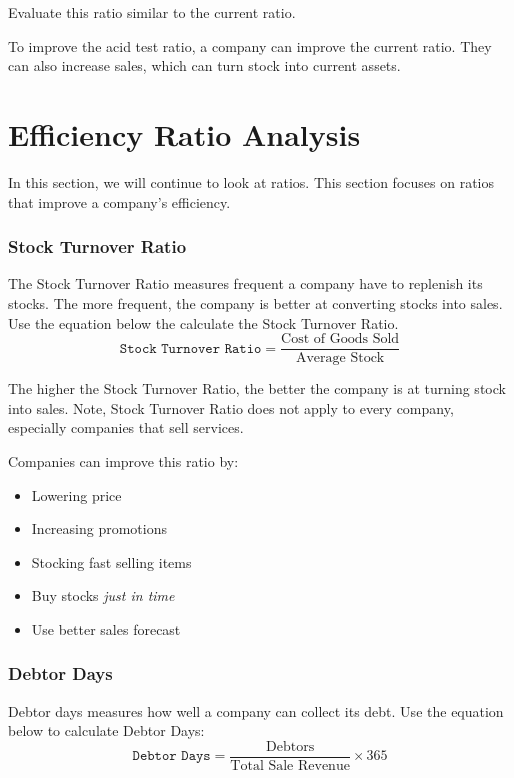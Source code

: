 \documentclass{standalone}
\begin{document}
Evaluate this ratio similar to the current ratio.

To improve the acid test ratio, a company can improve the current ratio.
They can also increase sales, which can turn stock into current assets.

\section{Efficiency Ratio Analysis}
In this section, we will continue to look at ratios.
This section focuses on ratios that improve a company's efficiency.

\subsubsection{Stock Turnover Ratio}
The Stock Turnover Ratio measures frequent a company have to replenish its stocks.
The more frequent, the company is better at converting stocks into sales.
Use the equation below the calculate the Stock Turnover Ratio.
\begin{equation}
    \texttt{Stock Turnover Ratio} = \frac{\textrm{Cost of Goods Sold}}{\textrm{Average Stock}}
\end{equation}

The higher the Stock Turnover Ratio, the better the company is at turning stock into sales.
Note, Stock Turnover Ratio does not apply to every company, especially companies that sell services.

Companies can improve this ratio by:
\begin{itemize}
    \item Lowering price
    \item Increasing promotions
    \item Stocking fast selling items
    \item Buy stocks \textit{just in time}
    \item Use better sales forecast
\end{itemize}

\subsubsection{Debtor Days}
Debtor days measures how well a company can collect its debt.
Use the equation below to calculate Debtor Days:
\begin{equation}
    \texttt{Debtor Days} = \frac{\textrm{Debtors}}{\textrm{Total Sale Revenue}} \times 365
\end{equation}
\end{document}
